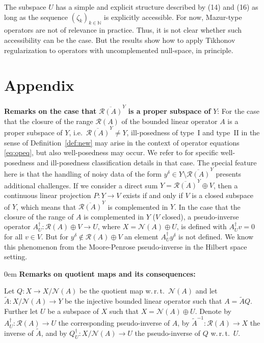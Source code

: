 \documentclass[12pt,twoside,reqno]{amsart}
\theoremstyle{definition}
\numberwithin{equation}{section}
\begin{document}
\smallskip

The subspace $U$ has a simple and explicit structure described by (14)
and (16) as long as the sequence $(\zeta_k)_{k\in\mathbb{N}}$ is
explicitly accessible. For now, Mazur-type operators are not of
relevance in practice. Thus, it is not clear whether such
accessibility can be the case. But the results show how to apply
Tikhonov regularization to operators with uncomplemented null-space, in
principle.

\pagebreak

\section*{Appendix}

\textbf{Remarks on the case that} $\overline{\mathcal{R}(A)}^Y$ \textbf{is a proper subspace of} $Y$:
For the case that the closure of the range $\mathcal{R}(A)$ of the bounded linear operator $A$ is a proper subspace of $Y$, i.e.~$\overline{\mathcal{R}(A)}^Y \not=Y$, ill-posedness of type~I and type~II in the sense of Definition~\ref{def:new} may arise in the context of operator equations \eqref{eq:opeq}, but also well-posedness may occur.
We refer to \cite[Sect.~5]{HofKin25} for specific well-posedness and ill-posedness classification details in that case. The special feature here is that the handling of noisy data of the form $y^\delta \in Y \setminus \overline{\mathcal{R}(A)}^Y$ presents additional challenges.
If we consider a direct sum $Y=\overline{\mathcal{R}(A)}^Y \oplus V$, then a continuous linear projection $P:Y \to V$ exists if and only if $V$ is a closed subspace of $Y$, which means that
$\overline{\mathcal{R}(A)}^Y$ is complemented in $Y$. In the case that the closure of the range of $A$ is complemented in $Y$ ($V$ closed), a pseudo-inverse operator $A^\dagger_U: \mathcal{R}(A) \oplus V \to U$, where
$X=\mathcal{N}(A) \oplus U$, is defined with $A^\dagger_U v=0$ for all $v \in V$. But for $y^\delta \notin \mathcal{R}(A) \oplus V$ an element $A^\dagger_U y^\delta$ is not defined. We know this phenomenon from the Moore-Penrose pseudo-inverse in the Hilbert space setting.

\bigskip

\parindent0em{ \textbf{Remarks on quotient maps and its consequences:}}

Let $Q:X\to X/\mathcal{N}(A)$ be the quotient map w.\,r.\,t.\ $\mathcal{N}(A)$ and let $\tilde{A}:X/\mathcal{N}(A)\to Y$ be the injective bounded linear operator such that $A=\tilde{A}Q$. Further let $U$ be a subspace of $X$ such that $X=\mathcal{N}(A)\oplus U$. Denote by $A_U^\dagger:\mathcal{R}(A)\to U$ the corresponding pseudo-inverse of $A$, by $\tilde{A}^{-1}:\mathcal{R}(A)\to X$ the inverse of $\tilde{A}$, and by $Q_U^\dagger:X/\mathcal{N}(A)\to U$ the pseudo-inverse of $Q$ w.\,r.\,t.\ $U$.
\end{document}

